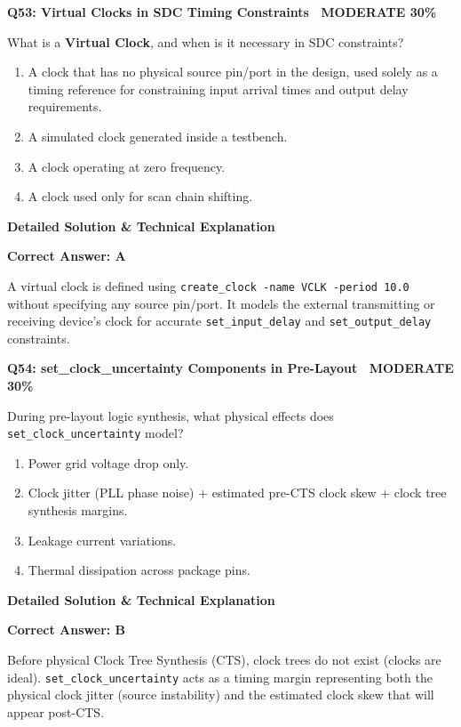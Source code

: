 \documentclass[11pt,a4paper]{article}
\newcommand{\badgemod}{{\color{white}\colorbox{modoran}{\bfseries\sffamily\tiny\ MODERATE 30\%\ }}}
\newenvironment{qbox}[2]{%
  \begin{mdframed}[style=qstyle]%
  {\bfseries\sffamily\color{primaryblue}#1 \hfill #2}\par\vspace{2pt}%
}{%
  \end{mdframed}%
}
\newenvironment{ansbox}{%
  \begin{mdframed}[style=ansstyle]%
  {\bfseries\sffamily\color{ansgreen}\small Detailed Solution \& Technical Explanation}\par\vspace{2pt}\small%
}{%
  \end{mdframed}%
}
\begin{document}
\begin{qbox}{Q53: Virtual Clocks in SDC Timing Constraints}{\badgemod}
What is a \textbf{Virtual Clock}, and when is it necessary in SDC constraints?
\begin{enumerate}[label=\textbf{\Alph*.}]
  \item A clock that has no physical source pin/port in the design, used solely as a timing reference for constraining input arrival times and output delay requirements.
  \item A simulated clock generated inside a testbench.
  \item A clock operating at zero frequency.
  \item A clock used only for scan chain shifting.
\end{enumerate}
\end{qbox}
\begin{ansbox}
\textbf{Correct Answer: A}

A virtual clock is defined using \texttt{create\_clock -name VCLK -period 10.0} without specifying any source pin/port. It models the external transmitting or receiving device's clock for accurate \texttt{set\_input\_delay} and \texttt{set\_output\_delay} constraints.
\end{ansbox}

\begin{qbox}{Q54: set\_clock\_uncertainty Components in Pre-Layout}{\badgemod}
During pre-layout logic synthesis, what physical effects does \texttt{set\_clock\_uncertainty} model?
\begin{enumerate}[label=\textbf{\Alph*.}]
  \item Power grid voltage drop only.
  \item Clock jitter (PLL phase noise) + estimated pre-CTS clock skew + clock tree synthesis margins.
  \item Leakage current variations.
  \item Thermal dissipation across package pins.
\end{enumerate}
\end{qbox}
\begin{ansbox}
\textbf{Correct Answer: B}

Before physical Clock Tree Synthesis (CTS), clock trees do not exist (clocks are ideal). \texttt{set\_clock\_uncertainty} acts as a timing margin representing both the physical clock jitter (source instability) and the estimated clock skew that will appear post-CTS.
\end{ansbox}
\end{document}
